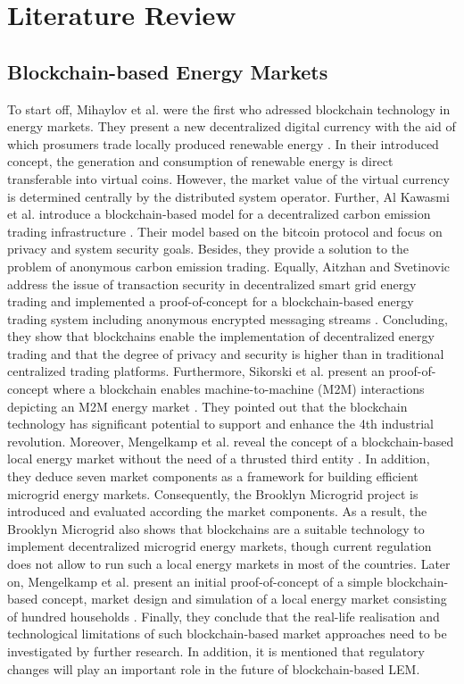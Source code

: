 \section{Literature Review}
\label{sec:literature_review}

\subsection{Blockchain-based Energy Markets}
\label{sec:Blockchain-based Energy Markets}
To start off, Mihaylov et al. were the first who adressed blockchain technology in energy markets. They present a new decentralized digital currency with the aid of which prosumers trade locally produced renewable energy . In their introduced concept, the generation and consumption of renewable energy is direct transferable into virtual coins. However, the market value of the virtual currency is determined centrally by the distributed system operator. Further, Al Kawasmi et al. introduce a blockchain-based model for a decentralized carbon emission trading infrastructure . Their model based on the bitcoin protocol  and focus on privacy and system security goals. Besides, they provide a solution to the problem of anonymous carbon emission trading. Equally, Aitzhan and Svetinovic address the issue of transaction security in decentralized smart grid energy trading and implemented a proof-of-concept for a blockchain-based energy trading system including anonymous encrypted messaging streams . Concluding, they show that blockchains enable the implementation of decentralized energy trading and that the degree of privacy and security is higher than in traditional centralized trading platforms. Furthermore, Sikorski et al. present an proof-of-concept where a blockchain enables machine-to-machine (M2M) interactions depicting an M2M energy market . They pointed out that the blockchain technology has significant potential to support and enhance the 4th industrial revolution. Moreover, Mengelkamp et al. reveal the concept of a blockchain-based local energy market without the need of a thrusted third entity . In addition, they deduce seven market components as a framework for building efficient microgrid energy markets. Consequently, the Brooklyn Microgrid project is introduced and evaluated according the market components. As a result, the Brooklyn Microgrid also shows that blockchains are a suitable technology to implement decentralized microgrid energy markets, though current regulation does not allow to run such a local energy markets in most of the countries. Later on, Mengelkamp et al. present an initial proof-of-concept of a simple blockchain-based concept, market design and simulation of a local energy market consisting of hundred households . Finally, they conclude that the real-life realisation and technological limitations of such blockchain-based market approaches need to be investigated by further research. In addition, it is mentioned that regulatory changes will play an important role in the future of blockchain-based LEM.

